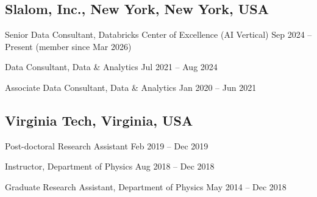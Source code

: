 \subsection{Slalom, Inc., New York, New York, USA}
\begin{zitemize}
    \item Senior Data Consultant, Databricks Center of Excellence (AI Vertical) \hfill Sep 2024 -- Present (member since Mar 2026)
    \item Data Consultant, Data \& Analytics \hfill Jul 2021 -- Aug 2024
    \item Associate Data Consultant, Data \& Analytics \hfill Jan 2020 -- Jun 2021
\end{zitemize}

\subsection{Virginia Tech, Virginia, USA}
\begin{zitemize}
    \item Post-doctoral Research Assistant \hfill Feb 2019 -- Dec 2019
    \item Instructor, Department of Physics \hfill Aug 2018 -- Dec 2018
    \item Graduate Research Assistant, Department of Physics \hfill May 2014 -- Dec 2018
\end{zitemize}